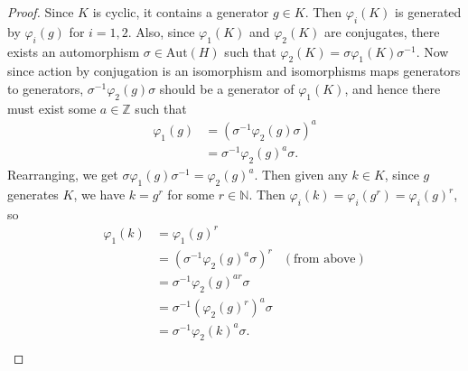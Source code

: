 \documentclass{article}
\begin{document}
\begin{enumerate}[label={\bf Q\arabic*:}]
    \begin{proof}
      Since $K$ is cyclic, it contains a generator $g\in K$. Then
      $\varphi_i(K)$ is generated by $\varphi_i(g)$ for $i=1,2$.  Also,
      since $\varphi_1(K)$ and $\varphi_2(K)$ are conjugates, there exists
      an automorphism $\sigma\in\text{Aut}(H)$ such that
      $\varphi_2(K)=\sigma\varphi_1(K)\sigma^{-1}$. Now since action by
      conjugation is an isomorphism and isomorphisms maps generators to
      generators, $\sigma^{-1}\varphi_2(g)\sigma$ should be a generator of
      $\varphi_1(K)$, and hence there must exist some $a\in\mathbb{Z}$ such
      that
      \begin{align*}
        \varphi_1(g)  &= (\sigma^{-1}\varphi_2(g)\sigma)^a \\
                      &= \sigma^{-1}\varphi_2(g)^a\sigma.
      \end{align*}
      Rearranging, we get $\sigma\varphi_1(g)\sigma^{-1}=\varphi_2(g)^a$.
      Then given any $k\in K$, since $g$ generates $K$, we have $k=g^r$ for
      some $r\in\mathbb{N}$. Then
      $\varphi_i(k)=\varphi_i(g^r)=\varphi_i(g)^r$, so
      \begin{align*}
        \varphi_1(k)  &= \varphi_1(g)^r & \\
                      &= (\sigma^{-1}\varphi_2(g)^a\sigma)^r & (\text{from
                        above}) \\
                      &= \sigma^{-1}\varphi_2(g)^{ar}\sigma & \\
                      &= \sigma^{-1}(\varphi_2(g)^r)^{a}\sigma & \\
                      &= \sigma^{-1}\varphi_2(k)^{a}\sigma. & \\
      \end{align*}


\end{proof}
\end{enumerate}
\end{document}
